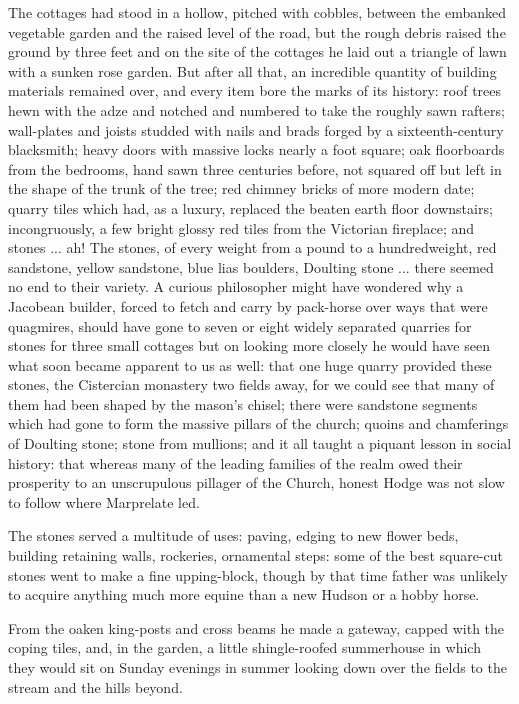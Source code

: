 The cottages had stood in a hollow, pitched with cobbles, between the embanked vegetable garden and the raised level of the road, but the rough debris raised the ground by three feet and on the site of the cottages he laid out a triangle of lawn with a sunken rose garden. But after all that, an incredible quantity of building materials remained over, and every item bore the marks of its history: roof trees hewn with the adze and notched and numbered to take the roughly sawn rafters; wall-plates and joists studded with nails and brads forged by a sixteenth-century blacksmith; heavy doors with massive locks nearly a foot square; oak floorboards from the bedrooms, hand sawn three centuries before, not squared off but left in the shape of the trunk of the tree; red chimney bricks of more modern date; quarry tiles which had, as a luxury, replaced the beaten earth floor downstairs; incongruously, a few bright glossy red tiles from the Victorian fireplace; and stones ... ah! The stones, of every weight from a pound to a hundredweight, red sandstone, yellow sandstone, blue lias boulders, Doulting stone ... there seemed no end to their variety. A curious philosopher might have wondered why a Jacobean builder, forced to fetch and carry by pack-horse over ways that were quagmires, should have gone to seven or eight widely separated quarries for stones for three small cottages but on looking more closely he would have seen what soon became apparent to us as well: that one huge quarry provided these stones, the Cistercian monastery two fields away, for we could see that many of them had been shaped by the mason's chisel; there were sandstone segments which had gone to form the massive pillars of the church; quoins and chamferings of Doulting stone; stone from mullions; and it all taught a piquant lesson in social history: that whereas many of the leading families of the realm owed their prosperity to an unscrupulous pillager of the Church, honest Hodge was not slow to follow where Marprelate led.

The stones served a multitude of uses: paving, edging to new flower beds, building retaining walls, rockeries, ornamental steps: some of the best square-cut stones went to make a fine upping-block, though by that time father was unlikely to acquire anything much more equine than a new Hudson or a hobby horse.

From the oaken king-posts and cross beams he made a gateway, capped with the coping tiles, and, in the garden, a little shingle-roofed summerhouse in which they would sit on Sunday evenings in summer looking down over the fields to the stream and the hills beyond.

